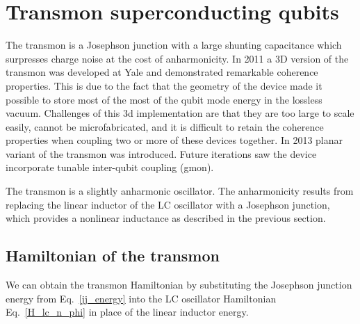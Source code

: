 \section{Transmon superconducting qubits}

The transmon is a Josephson junction with a large shunting capacitance which  surpresses charge noise at the cost of anharmonicity\cite{Koch2007}.
In 2011 a 3D version of the transmon was developed at Yale and demonstrated remarkable coherence properties.\cite{Paik2011}
This is due to the fact that the geometry of the device made it possible to store most of the most of the qubit mode energy in the lossless vacuum.
Challenges of this 3d implementation are that they are too large to scale easily, cannot be microfabricated,
and it is difficult to retain the coherence properties when coupling two or more of these devices together.
In 2013 planar variant of the transmon was introduced.\cite{Barends2013}
Future iterations saw the device incorporate tunable inter-qubit coupling (gmon).\cite{Chen2014}

The transmon is a slightly anharmonic oscillator.
The anharmonicity results from replacing the linear inductor of the LC oscillator with a Josephson junction,
which provides a nonlinear inductance as described in the previous section.

\subsection{Hamiltonian of the transmon}
We can obtain the transmon Hamiltonian by substituting the Josephson junction energy from Eq.~\ref{jj_energy} into the LC oscillator Hamiltonian
Eq.~\ref{H_lc_n_phi} in place of the linear inductor energy.



